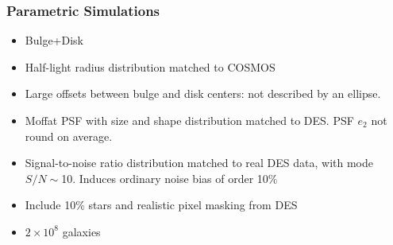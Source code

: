 \documentclass{beamer}
\begin{document}
\frame
{
    \frametitle{Parametric Simulations}

 
    \begin{itemize}

        \item {\color{gold} Bulge+Disk}

        \item Half-light radius distribution matched to COSMOS

        \item Large offsets between bulge and disk centers:
            {\color{lightskyblue} not described by an ellipse}.

        \item Moffat PSF with size and shape distribution
            matched to DES.  PSF $e_2$ not round on average.

        \item Signal-to-noise ratio distribution matched to real DES
            data, with {\color{lightskyblue} mode $S/N \sim$10}.  Induces ordinary noise
            bias of order 10\%
        
        \item Include 10\% {\color{brightred} stars} and realistic pixel
            {\color{orange} masking} from DES

        \item $2 \times 10^8$ galaxies


    \end{itemize}

}
\end{document}

